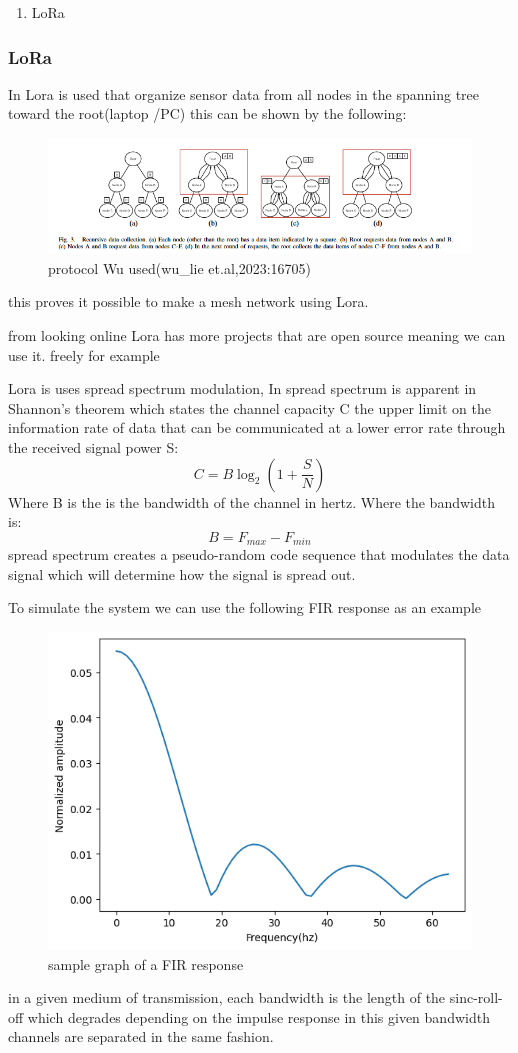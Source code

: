\begin{enumerate}
    \item LoRa
\end{enumerate}
\subsubsection{LoRa}

In \cite{Wu_Liebeherr_2023} Lora is used that organize sensor
data from all nodes in the spanning tree toward the root(laptop /PC) this can be shown by the  following:
\begin{figure}[h!]
    \centering
    \includegraphics[width=0.5\linewidth]{Images/lora_example_routing_proto.png}
    \caption{protocol Wu used(wu\_lie et.al,2023:16705)}
    \label{protocol Wu used(wu_lie et.al,2023:16705)}
\end{figure}  
this proves it possible to make a mesh network using Lora.
\par 
from looking online Lora has more projects that are open source meaning we can use it. freely for example 
\par
Lora is uses spread spectrum modulation, In \cite{2003_Information_2023} spread spectrum is apparent in Shannon's theorem which states the channel capacity C the upper limit on the information rate of data that can be communicated at a lower error rate through the received signal power S:
$$C=B\log_2(1+\frac{S}{N})$$
Where B is the is the bandwidth of the channel in hertz. Where the bandwidth is:
$$B=F_{max}-F_{min}$$
spread spectrum creates a pseudo-random code sequence that modulates the data signal which will determine how the signal is spread out.

To simulate the system we can use the following FIR response  as an example 
\begin{figure}[h!]
    \includegraphics[width=0.5\linewidth]{Images/FIR_response.png}
    \caption{sample graph of a FIR response}
    \label{sample graph of a FIR response}

\end{figure}
in a given medium of transmission, each bandwidth is the length of the sinc-roll-off which degrades depending on the impulse response in this given bandwidth channels are separated in the same fashion.
